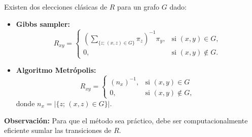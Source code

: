 \documentclass[a4paper]{article}
\numberwithin{equation}{subsection}
\begin{document}
Existen dos elecciones clásicas de $R$ para un grafo $G$ dado:
\begin{itemize}
    \item \textbf{Gibbs sampler: }
    \[R_{xy} = \begin{cases}
                \left(\sum_{\{z;\,(x,z)\in G\}}\pi_z\right)^{-1}\pi_y, & \text{si }(x,y)\in G,\\
                0, & \text{si }(x,y) \notin G.
                \end{cases}\]
    \item \textbf{Algoritmo Metrópolis: }
    \[R_{xy} = \begin{cases}
                (n_x)^{-1}, & \text{si }(x,y)\in G\\
                0, & \text{si }(x,y)\notin G,
                \end{cases}\]
    donde $n_x = |\{z;\,(x,z)\in G\}|$.
\end{itemize}
\textbf{Observación: }Para que el método sea práctico, debe ser computacionalmente eficiente sumlar las transiciones de $R$.\\ \newline
\end{document}
